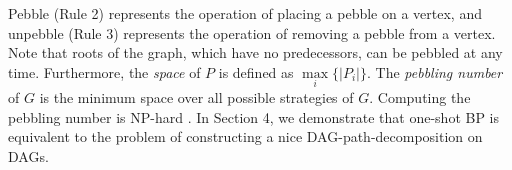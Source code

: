 \documentclass[runningheads]{llncs}
\theoremstyle{plain}
\theoremstyle{definition}
\newtheorem{definition}{Definition}
\begin{document}
Pebble (Rule 2) represents the operation of placing a pebble on a vertex, and unpebble (Rule 3) represents the operation of removing a pebble from a vertex. Note that roots of the graph, which have no predecessors, can be pebbled at any time. Furthermore, the \emph{space} of $P$ is defined as $\underset{i}{\max} \{ |P_i| \}$. The \emph{pebbling number} of $G$ is the minimum space over all possible strategies of $G$. Computing the pebbling number is NP-hard \cite{art16}. In Section 4, we demonstrate that one-shot BP is equivalent to the problem of constructing a nice DAG-path-decomposition on DAGs.
\begin{comment}
    

//////////////////////////////
To facilitate understanding of DAG-pathwidth, we first introduce the definitions of (undirected) path decomposition and pathwidth, followed by directed path decomposition and directed pathwidth.

\begin{definition}[Path Decomposition][\cite{art1}]
    Let $G = (V, E)$ be an undirected graph. A path decomposition of $G$ is a sequence $X = (X_1, X_2, \dots, X_s)$ of subsets $X_i \subseteq V$ $(i = 1, 2, \dots, s)$ that satisfies the following three conditions:
    \begin{enumerate}
        \item $X_1 \cup X_2 \cup \dots \cup X_s = V$.
        \item For any edge $(u, v) \in E$, there exists an $i \ (\geq 1)$ such that $u, v \in X_i$.
        \item For any integers $i, j, k\ (1 \leq i \leq j \leq k \leq s)$, $X_i \cap X_k \subseteq X_j$, that is, for any vertex $v \in V$, $v$ induces exactly one non-empty path in $X$.
    \end{enumerate}
\end{definition}

\begin{definition}[Pathwidth]
    For a path decomposition $X = (X_1, X_2, \dots, X_s)$ of an undirected graph $G$, the width of $X$ is defined as $\underset{i}{\max} \{ |X_i| - 1 \}$. The pathwidth of $G$ is the minimum width over all possible path decompositions of $G$.
\end{definition}

The pathwidth is a parameter that represents how closely the graph is to a path. The smaller the pathwidth, the closer the graph structure is to a path. Computing the pathwidth of a general undirected graph is NP-hard [\cite{art3}].


\end{comment}
\end{document}
